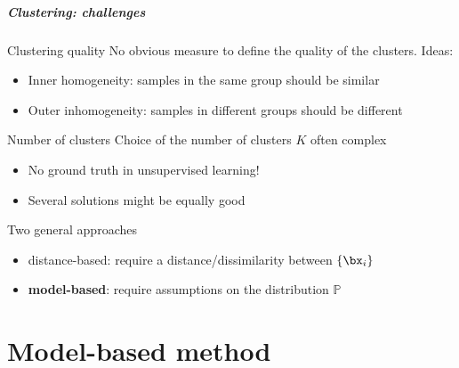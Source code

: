 \documentclass{beamer}\usepackage[]{graphicx}\usepackage[]{color}
\begin{document}
\begin{frame}[label=Clustering2]

  \frametitle{Clustering: challenges}

    \begin{block}{Clustering quality}
      No obvious measure to define the \alert{quality} of the clusters. Ideas:
      \begin{itemize}
        \item \alert{Inner} homogeneity: samples in the same group should be similar
        \item \alert{Outer} inhomogeneity: samples in different groups should be different
      \end{itemize}
    \end{block}

    \vspace{-.25cm}

    \begin{block}{Number of clusters}
      Choice of the number of clusters $K$ often complex
      \begin{itemize}
        \item No ground truth in unsupervised learning!
        \item Several solutions might be equally good
      \end{itemize}
    \end{block}

    \vspace{-.25cm}

    \begin{block}{Two general approaches}
      \vspace{-.25cm}
      \begin{itemize}
        \item distance-based: require a distance/dissimilarity between $\{\bx_i\}$
        \item \alert{\bf model-based}: require assumptions on the distribution $\mathbb{P}$
      \end{itemize}
    \end{block}
    
\end{frame}


\part{Model-based method}
\begin{frame}
  \partpage
\end{frame}
\end{document}
